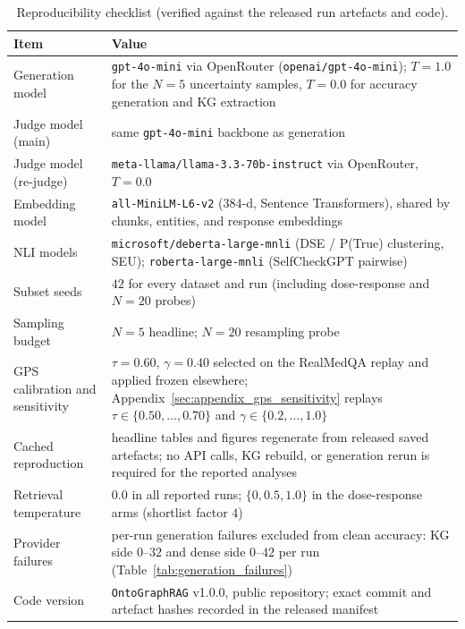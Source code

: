 \begin{table}[t]
\centering
\small
\caption{Reproducibility checklist (verified against the released run
artefacts and code).
\label{tab:repro_checklist}}
\setlength{\tabcolsep}{5pt}
\begin{tabular}{@{}lp{9.2cm}@{}}
\toprule
Item & Value \\
\midrule
Generation model & \texttt{gpt-4o-mini} via OpenRouter (\texttt{openai/gpt-4o-mini}); $T{=}1.0$ for the $N{=}5$ uncertainty samples, $T{=}0.0$ for accuracy generation and KG extraction \\
Judge model (main) & same \texttt{gpt-4o-mini} backbone as generation \\
Judge model (re-judge) & \texttt{meta-llama/llama-3.3-70b-instruct} via OpenRouter, $T{=}0.0$ \\
Embedding model & \texttt{all-MiniLM-L6-v2} (384-d, Sentence Transformers), shared by chunks, entities, and response embeddings \\
NLI models & \texttt{microsoft/deberta-large-mnli} (DSE / P(True) clustering, SEU); \texttt{roberta-large-mnli} (SelfCheckGPT pairwise) \\
Subset seeds & $42$ for every dataset and run (including dose-response and $N{=}20$ probes) \\
Sampling budget & $N{=}5$ headline; $N{=}20$ resampling probe \\
GPS calibration and sensitivity & $\tau{=}0.60$, $\gamma{=}0.40$ selected on the RealMedQA replay and applied frozen elsewhere; Appendix~\ref{sec:appendix_gps_sensitivity} replays $\tau \in \{0.50,\ldots,0.70\}$ and $\gamma \in \{0.2,\ldots,1.0\}$ \\
Cached reproduction & headline tables and figures regenerate from released saved artefacts; no API calls, KG rebuild, or generation rerun is required for the reported analyses \\
Retrieval temperature & $0.0$ in all reported runs; $\{0, 0.5, 1.0\}$ in the dose-response arms (shortlist factor $4$) \\
Provider failures & per-run generation failures excluded from clean accuracy: KG side $0$--$32$ and dense side $0$--$42$ per run (Table~\ref{tab:generation_failures}) \\
Code version & \texttt{OntoGraphRAG} v1.0.0, public repository; exact commit and artefact hashes recorded in the released manifest \\
\bottomrule
\end{tabular}
\end{table}

